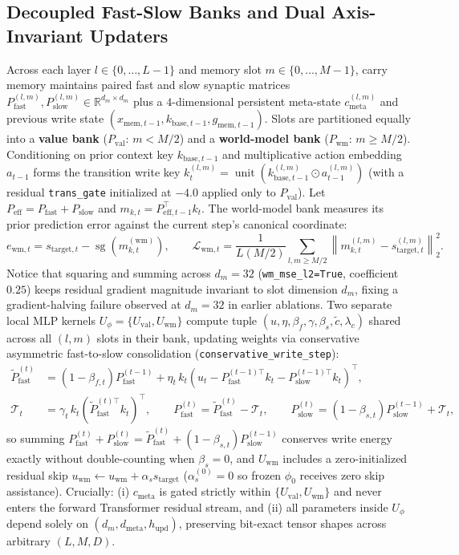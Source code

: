 \documentclass[11pt]{article}
\newcommand{\unit}[1]{\operatorname{unit}\!\left(#1\right)}
\newcommand{\sg}{\operatorname{sg}}
\newcommand{\Uphi}{U_\phi}
\newcommand{\Uval}{U_{\mathrm{val}}}
\newcommand{\Uwm}{U_{\mathrm{wm}}}
\newcommand{\Pval}{P_{\mathrm{val}}}
\newcommand{\Pwm}{P_{\mathrm{wm}}}
\newcommand{\Pfast}{P_{\mathrm{fast}}}
\newcommand{\Pslow}{P_{\mathrm{slow}}}
\newcommand{\cmeta}{c_{\mathrm{meta}}}
\begin{document}
\subsection{Decoupled Fast-Slow Banks and Dual Axis-Invariant Updaters}
Across each layer $l \in \{0,\dots,L-1\}$ and memory slot $m \in \{0,\dots,M-1\}$, carry memory maintains paired fast and slow synaptic matrices $\Pfast^{(l,m)}, \Pslow^{(l,m)} \in \mathbb{R}^{d_m \times d_m}$ plus a $4$-dimensional persistent meta-state $\cmeta^{(l,m)}$ and previous write state $(x_{\text{mem}, t-1}, k_{\text{base}, t-1}, g_{\text{mem}, t-1})$. Slots are partitioned equally into a \textbf{value bank} ($\Pval$: $m < M/2$) and a \textbf{world-model bank} ($\Pwm$: $m \ge M/2$). Conditioning on prior context key $k_{\text{base},t-1}$ and multiplicative action embedding $a_{t-1}$ forms the transition write key $k_t^{(l,m)} = \unit{k_{\text{base},t-1}^{(l,m)} \odot a_{t-1}^{(l,m)}}$ (with a residual \texttt{trans\_gate} initialized at $-4.0$ applied only to $\Pval$). Let $P_{\text{eff}} = \Pfast + \Pslow$ and $m_{k,t} = P_{\text{eff}, t-1}^\top k_t$. The world-model bank measures its prior prediction error against the current step's canonical coordinate:
\begin{equation}
e_{\text{wm}, t} = s_{\text{target}, t} - \sg(m_{k,t}^{(\mathrm{wm})}), \qquad
\mathcal{L}_{\text{wm}, t} = \frac{1}{L (M/2)} \sum_{l, m \ge M/2} \left\lVert m_{k,t}^{(l,m)} - s_{\text{target}, t}^{(l,m)} \right\rVert_2^2 .
\label{eq:wmmse}
\end{equation}
Notice that squaring and summing across $d_m = 32$ (\texttt{wm\_mse\_l2=True}, coefficient $0.25$) keeps residual gradient magnitude invariant to slot dimension $d_m$, fixing a gradient-halving failure observed at $d_m{=}32$ in earlier ablations. Two separate local MLP kernels $\Uphi = \{\Uval, \Uwm\}$ compute tuple $(u, \eta, \beta_f, \gamma, \beta_s, \tilde{c}, \lambda_c)$ shared across all $(l, m)$ slots in their bank, updating weights via conservative asymmetric fast-to-slow consolidation (\texttt{conservative\_write\_step}):
\begin{align}
\tilde{P}_{\text{fast}}^{(t)} &= (1 - \beta_{f,t}) \Pfast^{(t-1)} + \eta_t \, k_t \left(u_t - \Pfast^{(t-1)\top} k_t - \Pslow^{(t-1)\top} k_t\right)^\top, \nonumber \\
\mathcal{T}_t &= \gamma_t \, k_t \left(\tilde{P}_{\text{fast}}^{(t)\top} k_t\right)^\top, \qquad
\Pfast^{(t)} = \tilde{P}_{\text{fast}}^{(t)} - \mathcal{T}_t, \qquad
\Pslow^{(t)} = (1 - \beta_{s,t}) \Pslow^{(t-1)} + \mathcal{T}_t,
\label{eq:cons_write}
\end{align}
so summing $\Pfast^{(t)} + \Pslow^{(t)} = \tilde{P}_{\text{fast}}^{(t)} + (1-\beta_{s,t})\Pslow^{(t-1)}$ conserves write energy exactly without double-counting when $\beta_s = 0$, and $\Uwm$ includes a zero-initialized residual skip $u_{\mathrm{wm}} \leftarrow u_{\mathrm{wm}} + \alpha_s s_{\text{target}}$ ($\alpha_s^{(0)} = 0$ so frozen $\phi_0$ receives zero skip assistance). Crucially: (i) $\cmeta$ is gated strictly within $\{\Uval, \Uwm\}$ and never enters the forward Transformer residual stream, and (ii) all parameters inside $\Uphi$ depend solely on $(d_m, d_{\text{meta}}, h_{\text{upd}})$, preserving bit-exact tensor shapes across arbitrary $(L, M, D)$.
\end{document}
